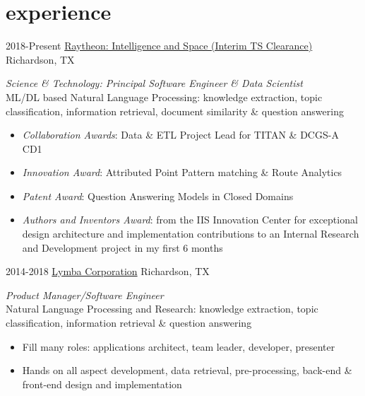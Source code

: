\documentclass[]{friggeri-cv} %
\begin{document}

\section{experience }

\begin{entrylist}
\entry
{2018-Present}
{\href{http://www.raytheon.com}{Raytheon: Intelligence and Space {\normalfont (Interim TS Clearance)}}}
{Richardson, TX}
{\emph{Science \& Technology: Principal Software Engineer \& Data Scientist} \\
ML/DL based Natural Language Processing: knowledge extraction, topic classification, information retrieval, document similarity \& question answering
\begin{itemize}
\item \emph{Collaboration Awards}: Data \& ETL Project Lead for TITAN \& DCGS-A CD1
\item \emph{Innovation Award}: Attributed Point Pattern matching \& Route Analytics
\item \emph{Patent Award}: Question Answering Models in Closed Domains
\item \emph{Authors and Inventors Award}: from the IIS Innovation Center for exceptional design architecture and implementation contributions to an Internal Research and Development project in my first 6 months
\end{itemize}}
\entry
{2014-2018}
{\href{http://www.lymba.com}{Lymba Corporation}}
{Richardson, TX}
{\emph{Product Manager/Software Engineer} \\
Natural Language Processing and Research: knowledge extraction, topic classification, information retrieval \& question answering
\begin{itemize}
\item Fill many roles: applications architect, team leader, developer, presenter
\end{itemize}
\begin{itemize}
\item Hands on all aspect development, data retrieval, pre-processing, back-end \& front-end design and implementation
\end{itemize}}

\end{entrylist}
\end{document}
